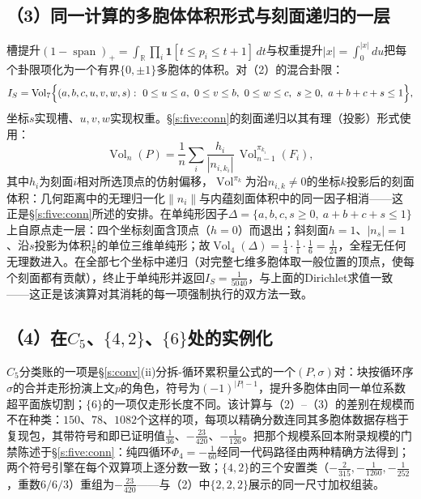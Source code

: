 \documentclass[11pt]{article}
\numberwithin{equation}{section}
\theoremstyle{definition}
\theoremstyle{remark}
\begin{document}
\subsection*{（3）同一计算的多胞体体积形式与刻面递归的一层}

槽提升$(1-\operatorname{span})_{+}=\int_{\mathbb R}\prod_i\mathbf 1[t\le p_i\le t+1]\,dt$与权重提升$|x|=\int_0^{|x|}du$把每个卦限项化为一个有界$\{0,\pm1\}$多胞体的体积。对（2）的混合卦限：
\[
I_S=\operatorname{Vol}_7\Bigl\{(a,b,c,u,v,w,s):\
0\le u\le a,\ 0\le v\le b,\ 0\le w\le c,\ s\ge0,\ a+b+c+s\le1\Bigr\},
\]
坐标$s$实现槽、$u,v,w$实现权重。\S\ref{s:five:conn}的刻面递归以其有理（投影）形式使用：
\[
\operatorname{Vol}_n(P)=\frac1n\sum_i
\frac{h_i}{|n_{i,k_i}|}\,\operatorname{Vol}_{n-1}^{\pi_{k_i}}(F_i),
\]
其中$h_i$为刻面$i$相对所选顶点的仿射偏移，$\operatorname{Vol}^{\pi_k}$为沿$n_{i,k}\ne0$的坐标$k$投影后的刻面体积：几何距离中的无理归一化$\|n_i\|$与内蕴刻面体积中的同一因子相消——这正是\S\ref{s:five:conn}所述的安排。在单纯形因子$\Delta=\{a,b,c,s\ge0,\ a{+}b{+}c{+}s\le1\}$上自原点走一层：四个坐标刻面含顶点（$h=0$）而退出；斜刻面$h=1$、$|n_s|=1$、沿$s$投影为体积$\tfrac16$的单位三维单纯形；故$\operatorname{Vol}_4(\Delta)=\tfrac14\cdot\tfrac11\cdot\tfrac16=\tfrac1{24}$，全程无任何无理数进入。在全部七个坐标中递归（对完整七维多胞体取一般位置的顶点，使每个刻面都有贡献），终止于单纯形并返回$I_S=\tfrac1{5040}$，与上面的Dirichlet求值一致——这正是该演算对其消耗的每一项强制执行的双方法一致。

\subsection*{（4）在$C_5$、$\{4,2\}$、$\{6\}$处的实例化}

$C_5$分类账的一项是\S\ref{s:conv}(ii)分拆-循环累积量公式的一个$(P,\sigma)$对：块按循环序$\sigma$的合并走形扮演上文$p$的角色，符号为$(-1)^{|P|-1}$，提升多胞体由同一单位系数超平面族切割；$\{6\}$的一项仅走形长度不同。该计算与（2）--（3）的差别在规模而不在种类：$150$、$78$、$1082$个这样的项，每项以精确分数连同其多胞体数据存档于复现包，其带符号和即已证明值$\tfrac1{36}$、$-\tfrac{23}{420}$、$-\tfrac1{126}$。把那个规模系回本附录规模的门禁陈述于\S\ref{s:five:conn}：纯四循环$\Phi_4=-\tfrac1{60}$经同一代码路径由两种精确方法得到；两个符号引擎在每个双算项上逐分数一致；$\{4,2\}$的三个安置类（$-\tfrac2{315},-\tfrac1{1260},-\tfrac1{252}$，重数$6/6/3$）重组为$-\tfrac{23}{420}$——与（2）中$\{2,2,2\}$展示的同一尺寸加权组装。
\end{document}

